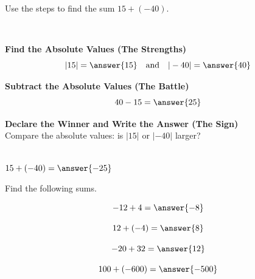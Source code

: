 \documentclass{ximera}[font=12pt]
\begin{document}
\begin{problem}
    Use the steps to find the sum $15 + (-40).$

    ~ \\[1em]

    \begin{description}[style=multiline, leftmargin=5em, font=\bfseries]
        \item[Step 1:] \textbf{Find the Absolute Values (The Strengths)} \\
        
            \[ |15| = \answer{15} \quad \text{and} \quad |-40|  = \answer{40}  \]

        \item[Step 2:] \textbf{Subtract the Absolute Values (The Battle)} \\
            \[ 40 - 15 =  \answer{25}  \]

        \item[Step 3:] \textbf{Declare the Winner and Write the Answer (The Sign)} \\
        Compare the absolute values: is $|15|$ or $|-40|$ larger?
    
        \begin{multipleChoice}
        \end{multipleChoice}

    ~ \\[2em]

     $15 + (-40) = \answer{-25}$


\end{description}
\end{problem}


\begin{problem}
Find the following sums.

\[ -12 + 4 =  \answer{-8}   \]

\[ 12 + (-4) =  \answer{8}   \]

\[ -20 + 32  =  \answer{12} \]

\[ 100 + (-600) =  \answer{-500}  \]


\end{problem}
\end{document}
